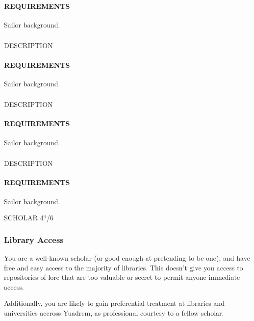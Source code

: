     \paragraph{REQUIREMENTS} Sailor background.

    \subsubsection{} \label{feat::NAME}
    DESCRIPTION
    \paragraph{REQUIREMENTS} Sailor background.

    \subsubsection{} \label{feat::NAME}
    DESCRIPTION
    \paragraph{REQUIREMENTS} Sailor background.

    \subsubsection{} \label{feat::NAME}
    DESCRIPTION
    \paragraph{REQUIREMENTS} Sailor background.

SCHOLAR 4?/6
    \subsubsection{Library Access} \label{feat::libraryaccess}
    You are a well-known scholar (or good enough at pretending to be one), and have free and easy access to the majority of libraries.
    This doesn't give you access to repositories of lore that are too valuable or secret to permit anyone immediate access.

    Additionally, you are likely to gain preferential treatment at libraries and universities accross Yuadrem, as professional courtesy to a fellow scholar.

